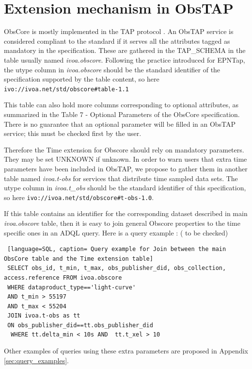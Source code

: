 \documentclass[11pt,a4paper]{ivoa}
\begin{document}
 \section{Extension mechanism in ObsTAP }
 \label{sec:comext}
 ObsCore is mostly implemented in the TAP protocol \citep{2019ivoa.spec.0927D}.
 An ObsTAP service is considered compliant to the standard if it serves all the attributes tagged as mandatory in the specification.
 These are gathered in the TAP\_SCHEMA in the table usually named \emph{ivoa.obscore}. 
 Following the practice introduced  for EPNTap,  the utype column in \emph{ivoa.obscore} should be the standard identifier of the specification supported by the table content, so here \texttt{ivo://ivoa.net/std/obscore\#table-1.1}
 
 This table can also hold more columns corresponding to  optional attributes, as summarized in the Table 7 - Optional Parameters  of the ObsCore specification.
 There is no guarantee that an optional parameter will be filled in an ObsTAP service; this must be checked first by the user. 
 
 Therefore the Time extension for Obscore should rely on mandatory parameters. 
 They may be set UNKNOWN if unknown.
 In order to warn users that extra time parameters have been included in ObsTAP, we propose to gather them  in another table named \emph{ivoa.t-obs}
 for services that distribute time sampled data sets. 
 The utype column in  \emph{ivoa.t\_obs} should be the standard identifier of this specification, so here \texttt{ivo://ivoa.net/std/obscore\#t-obs-1.0}.

 If this table contains an identifier for the corresponding dataset described in main \emph{ivoa.obscore} table, then it is easy to join  general Obscore properties to the time specific ones in an ADQL query.
 Here is a query  example :  ( to be checked) 
 \begin{lstlisting} [language=SQL, caption= Query example for Join between the main ObsCore table and the Time extension table]
 SELECT obs_id, t_min, t_max, obs_publisher_did, obs_collection, access.reference FROM ivoa.obscore 
 WHERE dataproduct_type=='light-curve'
 AND t_min > 55197 
 AND t_max < 55204
 JOIN ivoa.t-obs as tt
 ON obs_publisher_did==tt.obs_publisher_did
  WHERE tt.delta_min < 10s AND  tt.t_xel > 10
 \end{lstlisting}

Other examples of queries using these extra parameters are proposed in Appendix \ref{sec:query_examples}.
\end{document}
